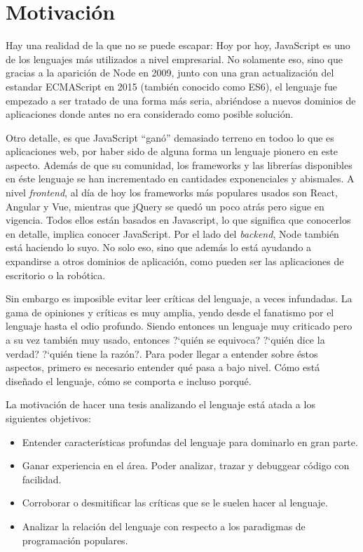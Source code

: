\section{Motivación}

Hay una realidad de la que no se puede escapar: Hoy por hoy, JavaScript es uno de los lenguajes más utilizados a nivel empresarial. No solamente eso, sino que gracias a la aparición de Node en 2009, junto con una gran actualización del estandar ECMAScript en 2015 (también conocido como ES6), el lenguaje fue empezado a ser tratado de una forma más seria, abriéndose a nuevos dominios de aplicaciones donde antes no era considerado como posible solución.

Otro detalle, es que JavaScript "`ganó"' demasiado terreno en todoo lo que es aplicaciones web, por haber sido de alguna forma un lenguaje pionero en este aspecto. Además de que su comunidad, los frameworks y las librerías disponibles en éste lenguaje se han incrementado en cantidades exponenciales y abismales. A nivel \textit{frontend}, al día de hoy los frameworks más populares usados son React, Angular y Vue, mientras que jQuery se quedó un poco atrás pero sigue en vigencia. Todos ellos están basados en Javascript, lo que significa que conocerlos en detalle, implica conocer JavaScript. Por el lado del \textit{backend}, Node también está haciendo lo suyo. No solo eso, sino que además lo está ayudando a expandirse a otros dominios de aplicación, como pueden ser las aplicaciones de escritorio o la robótica.

Sin embargo es imposible evitar leer críticas del lenguaje, a veces infundadas. La gama de opiniones y críticas es muy amplia, yendo desde el fanatismo por el lenguaje hasta el odio profundo. Siendo entonces un lenguaje muy criticado pero a su vez también muy usado, entonces ?`quién se equivoca? ?`quién dice la verdad? ?`quién tiene la razón?. Para poder llegar a entender sobre éstos aspectos, primero es necesario entender qué pasa a bajo nivel. Cómo está diseñado el lenguaje, cómo se comporta e incluso porqué.

La motivación de hacer una tesis analizando el lenguaje está atada a los siguientes objetivos:

\begin{itemize}
\item Entender características profundas del lenguaje para dominarlo en gran parte.
\item Ganar experiencia en el área. Poder analizar, trazar y debuggear código con facilidad.
\item Corroborar o desmitificar las críticas que se le suelen hacer al lenguaje.
\item Analizar la relación del lenguaje con respecto a los paradigmas de programación populares.
\end{itemize}